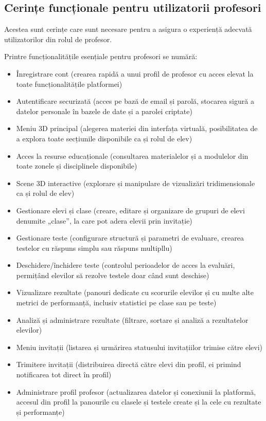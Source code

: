\subsection{Cerințe funcționale pentru utilizatorii profesori}
\label{sub-sec:proj-requirements-teachers}

Acestea sunt cerințe care sunt necesare pentru a
asigura o experiență adecvată utilizatorilor din rolul de profesor.

Printre funcționalitățile esențiale pentru profesori se numără:

\begin{itemize}
  \item Înregistrare cont (crearea rapidă a unui profil de profesor cu acces elevat la toate funcționalitățile platformei)
  \item Autentificare securizată (acces pe bază de email și parolă, stocarea sigură a datelor personale în bazele de date și a parolei criptate)
  \item Meniu 3D principal (alegerea materiei din interfața virtuală, posibilitatea de a explora toate secțiunile disponibile ca și rolul de elev)
  \item Acces la resurse educaționale (consultarea materialelor și a modulelor din toate zonele și disciplinele disponibile)
  \item Scene 3D interactive (explorare și manipulare de vizualizări tridimensionale ca și rolul de elev)
  \item Gestionare elevi și clase (creare, editare și organizare de grupuri de elevi denumite „clase”, la care pot adera elevii prin invitație)
  \item Gestionare teste (configurare structură și parametri de evaluare, crearea testelor cu răspuns simplu sau răspuns multipllu)
  \item Deschidere/închidere teste (controlul perioadelor de acces la evaluări, permițând elevilor să rezolve testele doar când sunt deschise)
  \item Vizualizare rezultate (panouri dedicate cu scorurile elevilor și cu multe alte metrici de performanță, inclusiv statistici pe clase sau pe teste)
  \item Analiză și administrare rezultate (filtrare, sortare și analiză a rezultatelor elevilor)
  \item Meniu invitații (listarea și urmărirea statusului invitațiilor trimise către elevi)
  \item Trimitere invitații (distribuirea directă către elevi din profil, ei primind notificarea tot direct în profil)
  \item Administrare profil profesor (actualizarea datelor și conexiunii la platformă, accesul din profil la panourile cu clasele și testele create și
  la cele cu rezultate și performanțe)
\end{itemize}


